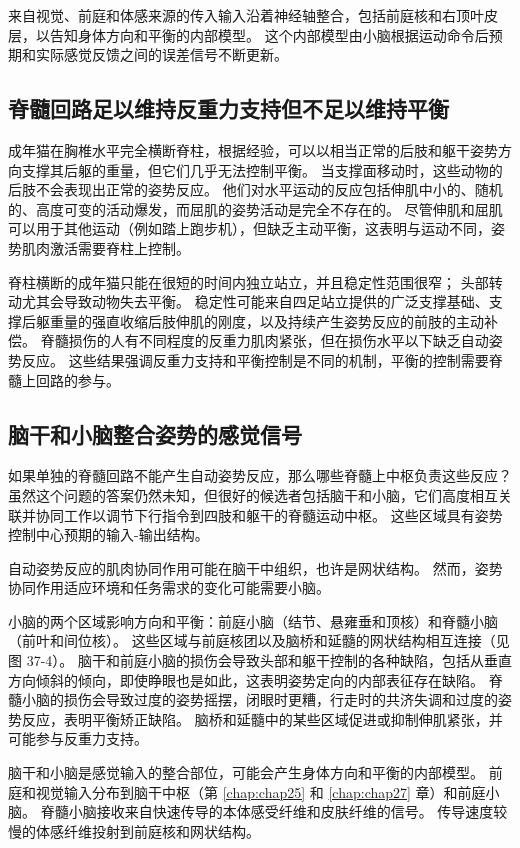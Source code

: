 来自视觉、前庭和体感来源的传入输入沿着神经轴整合，包括前庭核和右顶叶皮层，以告知身体方向和平衡的内部模型。 这个内部模型由小脑根据运动命令后预期和实际感觉反馈之间的误差信号不断更新。

\subsection{脊髓回路足以维持反重力支持但不足以维持平衡}
成年猫在胸椎水平完全横断脊柱，根据经验，可以以相当正常的后肢和躯干姿势方向支撑其后躯的重量，但它们几乎无法控制平衡。 当支撑面移动时，这些动物的后肢不会表现出正常的姿势反应。 他们对水平运动的反应包括伸肌中小的、随机的、高度可变的活动爆发，而屈肌的姿势活动是完全不存在的。 尽管伸肌和屈肌可以用于其他运动（例如踏上跑步机），但缺乏主动平衡，这表明与运动不同，姿势肌肉激活需要脊柱上控制。

脊柱横断的成年猫只能在很短的时间内独立站立，并且稳定性范围很窄； 头部转动尤其会导致动物失去平衡。 稳定性可能来自四足站立提供的广泛支撑基础、支撑后躯重量的强直收缩后肢伸肌的刚度，以及持续产生姿势反应的前肢的主动补偿。 脊髓损伤的人有不同程度的反重力肌肉紧张，但在损伤水平以下缺乏自动姿势反应。 这些结果强调反重力支持和平衡控制是不同的机制，平衡的控制需要脊髓上回路的参与。

\subsection{脑干和小脑整合姿势的感觉信号}

如果单独的脊髓回路不能产生自动姿势反应，那么哪些脊髓上中枢负责这些反应？ 虽然这个问题的答案仍然未知，但很好的候选者包括脑干和小脑，它们高度相互关联并协同工作以调节下行指令到四肢和躯干的脊髓运动中枢。 这些区域具有姿势控制中心预期的输入-输出结构。

自动姿势反应的肌肉协同作用可能在脑干中组织，也许是网状结构。 然而，姿势协同作用适应环境和任务需求的变化可能需要小脑。

小脑的两个区域影响方向和平衡：前庭小脑（结节、悬雍垂和顶核）和脊髓小脑（前叶和间位核）。 这些区域与前庭核团以及脑桥和延髓的网状结构相互连接（见图 37-4）。 脑干和前庭小脑的损伤会导致头部和躯干控制的各种缺陷，包括从垂直方向倾斜的倾向，即使睁眼也是如此，这表明姿势定向的内部表征存在缺陷。 脊髓小脑的损伤会导致过度的姿势摇摆，闭眼时更糟，行走时的共济失调和过度的姿势反应，表明平衡矫正缺陷。 脑桥和延髓中的某些区域促进或抑制伸肌紧张，并可能参与反重力支持。

脑干和小脑是感觉输入的整合部位，可能会产生身体方向和平衡的内部模型。 前庭和视觉输入分布到脑干中枢（第 \ref{chap:chap25} 和 \ref{chap:chap27} 章）和前庭小脑。 脊髓小脑接收来自快速传导的本体感受纤维和皮肤纤维的信号。 传导速度较慢的体感纤维投射到前庭核和网状结构。

